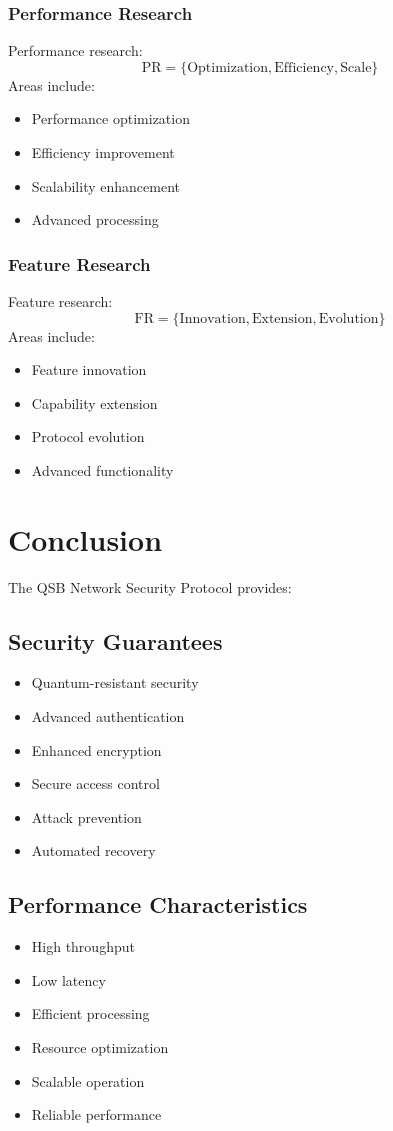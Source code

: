 \documentclass[12pt]{article}
\begin{document}
\subsubsection{Performance Research}
Performance research:
\begin{equation}
\text{PR} = \{\text{Optimization}, \text{Efficiency}, \text{Scale}\}
\end{equation}
Areas include:
\begin{itemize}
\item Performance optimization
\item Efficiency improvement
\item Scalability enhancement
\item Advanced processing
\end{itemize}
\subsubsection{Feature Research}
Feature research:
\begin{equation}
\text{FR} = \{\text{Innovation}, \text{Extension}, \text{Evolution}\}
\end{equation}
Areas include:
\begin{itemize}
\item Feature innovation
\item Capability extension
\item Protocol evolution
\item Advanced functionality
\end{itemize}
\section{Conclusion}
The QSB Network Security Protocol provides:
\subsection{Security Guarantees}
\begin{itemize}
\item Quantum-resistant security
\item Advanced authentication
\item Enhanced encryption
\item Secure access control
\item Attack prevention
\item Automated recovery
\end{itemize}
\subsection{Performance Characteristics}
\begin{itemize}
\item High throughput
\item Low latency
\item Efficient processing
\item Resource optimization
\item Scalable operation
\item Reliable performance
\end{itemize}
\end{document}
